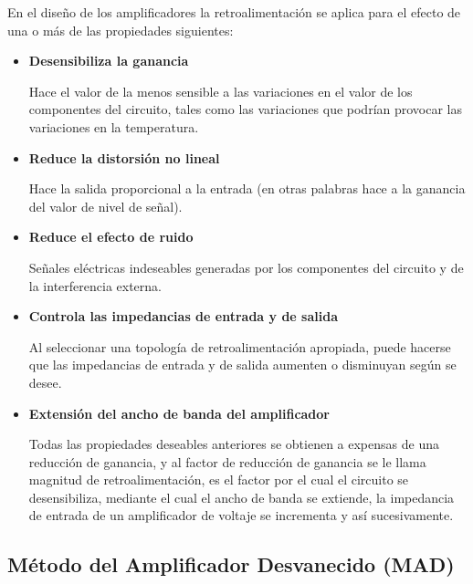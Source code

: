         En el diseño de los amplificadores la retroalimentación se aplica para el efecto de una o más de las propiedades siguientes:
        \begin{itemize}
            
            \item \textbf{Desensibiliza la ganancia} 
    
                Hace el valor de la menos sensible a las variaciones en el valor de los componentes del circuito, tales como las variaciones que podrían provocar las variaciones en la temperatura.
    
            \item \textbf{Reduce la distorsión no lineal}
    
                 Hace la salida proporcional a la entrada (en otras palabras hace a la ganancia del valor de nivel de señal).
    
            \item \textbf{Reduce el efecto de ruido}
    
                Señales eléctricas indeseables generadas por los componentes del circuito y de la interferencia externa.
    
            \item \textbf{Controla las impedancias de entrada y de salida}
    
                Al seleccionar una topología de retroalimentación apropiada, puede hacerse que las impedancias de entrada y de salida aumenten o disminuyan según se desee.
    
            \item \textbf{Extensión del ancho de banda del amplificador}
    
                Todas las propiedades deseables anteriores se obtienen a expensas de una reducción de ganancia, y al factor de reducción de ganancia se le llama magnitud de retroalimentación, es el factor por el cual el circuito se desensibiliza, mediante el cual el ancho de banda se extiende, la impedancia de entrada de un amplificador de voltaje se incrementa y así sucesivamente.

        \end{itemize}
    \subsection{Método del Amplificador Desvanecido (MAD)}

